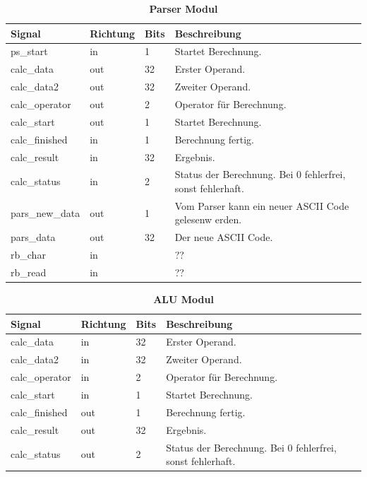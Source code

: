 \begin{table}[!h]
\caption{\textbf{Parser Modul}}
 \begin{center}
  \begin{tabular}{|p{4cm}|p{}|p{1cm}|p{9cm}|}
   \hline Signal & Richtung & Bits & Beschreibung\\
   \hline
   ps\_start & in & 1 & Startet Berechnung.\\
   calc\_data & out & 32 & Erster Operand.\\
   calc\_data2 & out & 32 & Zweiter Operand.\\
   calc\_operator & out & 2 & Operator für Berechnung.\\
   calc\_start & out & 1 & Startet Berechnung.\\
   calc\_finished & in & 1 & Berechnung fertig.\\
   calc\_result & in & 32 & Ergebnis.\\
   calc\_status & in & 2 & Status der Berechnung. Bei 0 fehlerfrei, sonst fehlerhaft.\\
   pars\_new\_data & out & 1 & Vom Parser kann ein neuer ASCII Code gelesenw erden.\\
   pars\_data & out & 32 & Der neue ASCII Code.\\
   rb\_char & in &  & ??\\
   rb\_read & in &  & ??\\
   \hline
  \end{tabular}
 \end{center}
\end{table}


\begin{table}[!h]
\caption{\textbf{ALU Modul}}
 \begin{center}
  \begin{tabular}{|p{4cm}|p{}|p{1cm}|p{9cm}|}
   \hline Signal & Richtung & Bits & Beschreibung\\
   \hline
   calc\_data & in & 32 & Erster Operand.\\
   calc\_data2 & in & 32 & Zweiter Operand.\\
   calc\_operator & in & 2 & Operator für Berechnung.\\
   calc\_start & in & 1 & Startet Berechnung.\\
   calc\_finished & out & 1 & Berechnung fertig.\\
   calc\_result & out & 32 & Ergebnis.\\
   calc\_status & out & 2 & Status der Berechnung. Bei 0 fehlerfrei, sonst fehlerhaft.\\
   \hline
  \end{tabular}
 \end{center}
\end{table}

